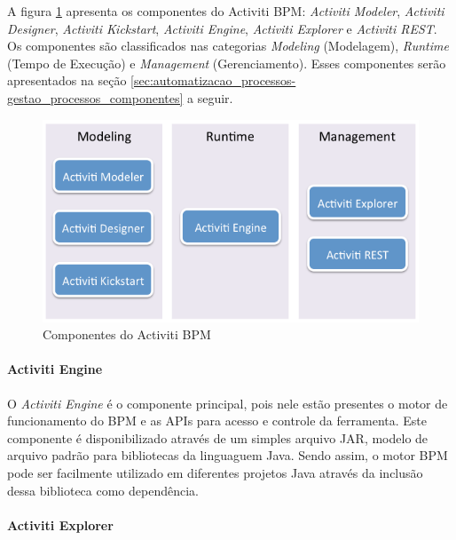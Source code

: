 A figura \ref{fig:activiti_componentes} apresenta os componentes do Activiti BPM: \textit{Activiti Modeler}, \textit{Activiti Designer}, \textit{Activiti Kickstart}, \textit{Activiti Engine}, \textit{Activiti Explorer} e \textit{Activiti REST}. Os componentes são classificados nas categorias \textit{Modeling} (Modelagem), \textit{Runtime} (Tempo de Execução) e \textit{Management} (Gerenciamento). Esses componentes serão apresentados na seção \ref{sec:automatizacao_processos-gestao_processos_componentes} a seguir.

\begin{figure}[H]
\centering
\includegraphics[width=1\textwidth]{imagens/activiti_components_overview.png}
\caption{Componentes do Activiti BPM\cite{activiti_componentes}}
\label{fig:activiti_componentes}
\end{figure}

\paragraph{Activiti Engine}\label{sec:automatizacao_processos-gestao_processos_activiti_engine}

O \textit{Activiti Engine} é o componente principal, pois nele estão presentes o motor de funcionamento do BPM e as APIs para acesso e controle da ferramenta. Este componente é disponibilizado através de um simples arquivo JAR\cite{jar}, modelo de arquivo padrão para bibliotecas da linguaguem Java. Sendo assim, o motor BPM pode ser facilmente utilizado em diferentes projetos Java através da inclusão dessa biblioteca como dependência.

\paragraph{Activiti Explorer}\label{sec:automatizacao_processos-gestao_processos_activiti_explorer}

